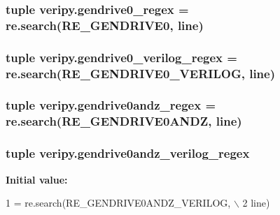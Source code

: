 \hypertarget{namespaceveripy_aa2af1923077c3d88816ed1449896be05}{
\subsubsection[{gendrive0\-\_\-regex}]{\setlength{\rightskip}{0pt plus 5cm}tuple veripy.\-gendrive0\-\_\-regex = re.\-search(R\-E\-\_\-\-G\-E\-N\-D\-R\-I\-V\-E0, {\bf line})}}\label{namespaceveripy_aa2af1923077c3d88816ed1449896be05}
\hypertarget{namespaceveripy_a8d38e767dc483e41e1e69ef6e81b514f}{
\subsubsection[{gendrive0\-\_\-verilog\-\_\-regex}]{\setlength{\rightskip}{0pt plus 5cm}tuple veripy.\-gendrive0\-\_\-verilog\-\_\-regex = re.\-search(R\-E\-\_\-\-G\-E\-N\-D\-R\-I\-V\-E0\-\_\-\-V\-E\-R\-I\-L\-O\-G, {\bf line})}}\label{namespaceveripy_a8d38e767dc483e41e1e69ef6e81b514f}
\hypertarget{namespaceveripy_a6882cd46af143e35f1d53de0c5961049}{
\subsubsection[{gendrive0andz\-\_\-regex}]{\setlength{\rightskip}{0pt plus 5cm}tuple veripy.\-gendrive0andz\-\_\-regex = re.\-search(R\-E\-\_\-\-G\-E\-N\-D\-R\-I\-V\-E0\-A\-N\-D\-Z, {\bf line})}}\label{namespaceveripy_a6882cd46af143e35f1d53de0c5961049}
\hypertarget{namespaceveripy_a59d33ef53803dc897114e47da6616883}{
\subsubsection[{gendrive0andz\-\_\-verilog\-\_\-regex}]{\setlength{\rightskip}{0pt plus 5cm}tuple veripy.\-gendrive0andz\-\_\-verilog\-\_\-regex}}\label{namespaceveripy_a59d33ef53803dc897114e47da6616883}
{\bfseries Initial value\-:}
\begin{DoxyCode}
1 = re.search(RE\_GENDRIVE0ANDZ\_VERILOG, \(\backslash\)
2                                                     line)
\end{DoxyCode}
